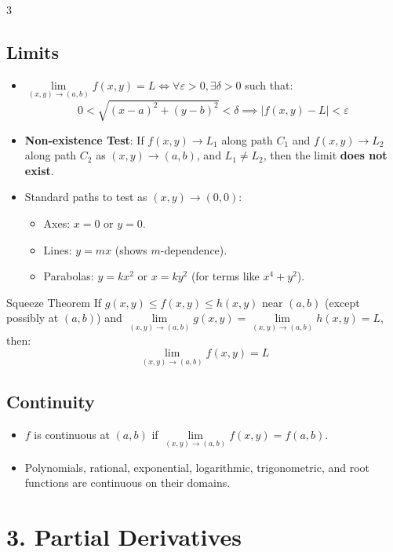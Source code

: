 \documentclass[10pt,landscape,a4paper]{article}
\begin{document}
\begin{multicols*}{3}
\subsection{Limits}
\begin{itemize}
    \item $\lim\limits_{(x,y) \to (a,b)} f(x,y) = L \iff \forall \varepsilon > 0, \exists \delta > 0$ such that:
    \[ 0 < \sqrt{(x-a)^2 + (y-b)^2} < \delta \implies |f(x,y) - L| < \varepsilon \]
    \item \textbf{Non-existence Test}: If $f(x,y) \to L_1$ along path $C_1$ and $f(x,y) \to L_2$ along path $C_2$ as $(x,y) \to (a,b)$, and $L_1 \neq L_2$, then the limit \textbf{does not exist}.
    \item Standard paths to test as $(x,y) \to (0,0)$:
    \begin{itemize}
        \item Axes: $x=0$ or $y=0$.
        \item Lines: $y=mx$ (shows $m$-dependence).
        \item Parabolas: $y=kx^2$ or $x=ky^2$ (for terms like $x^4+y^2$).
    \end{itemize}
\end{itemize}

\begin{theorembox}{Squeeze Theorem}
If $g(x,y) \leq f(x,y) \leq h(x,y)$ near $(a,b)$ (except possibly at $(a,b)$) and $\lim\limits_{(x,y) \to (a,b)} g(x,y) = \lim\limits_{(x,y) \to (a,b)} h(x,y) = L$, then:
\[ \lim_{(x,y) \to (a,b)} f(x,y) = L \]
\end{theorembox}

\subsection{Continuity}
\begin{itemize}
    \item $f$ is continuous at $(a,b)$ if $\lim\limits_{(x,y) \to (a,b)} f(x,y) = f(a,b)$.
    \item Polynomials, rational, exponential, logarithmic, trigonometric, and root functions are continuous on their domains.
\end{itemize}

\section{3. Partial Derivatives}

\end{multicols*}
\end{document}
